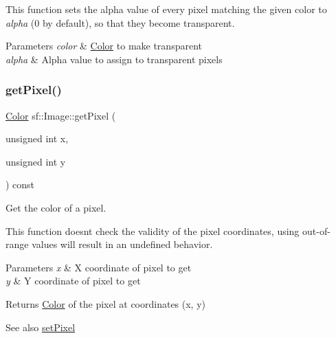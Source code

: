 This function sets the alpha value of every pixel matching the given color to {\itshape alpha} (0 by default), so that they become transparent.


\begin{DoxyParams}{Parameters}
{\em color} & \hyperlink{classsf_1_1_color}{Color} to make transparent \\
\hline
{\em alpha} & Alpha value to assign to transparent pixels \\
\hline
\end{DoxyParams}
\mbox{\label{classsf_1_1_image_acf278760458433b2c3626a6980388a95}} 
\subsubsection{\texorpdfstring{get\+Pixel()}{getPixel()}}
{\footnotesize\ttfamily \hyperlink{classsf_1_1_color}{Color} sf\+::\+Image\+::get\+Pixel (\begin{DoxyParamCaption}\item[{unsigned int}]{x,  }\item[{unsigned int}]{y }\end{DoxyParamCaption}) const}



Get the color of a pixel. 

This function doesn\textquotesingle{}t check the validity of the pixel coordinates, using out-\/of-\/range values will result in an undefined behavior.


\begin{DoxyParams}{Parameters}
{\em x} & X coordinate of pixel to get \\
\hline
{\em y} & Y coordinate of pixel to get\\
\hline
\end{DoxyParams}
\begin{DoxyReturn}{Returns}
\hyperlink{classsf_1_1_color}{Color} of the pixel at coordinates (x, y)
\end{DoxyReturn}
\begin{DoxySeeAlso}{See also}
\hyperlink{classsf_1_1_image_a9fd329b8cd7d4439e07fb5d3bb2d9744}{set\+Pixel} 
\end{DoxySeeAlso}
\mbox{\label{classsf_1_1_image_ad9562b126fc8d5efcf608166992865c7}} 
